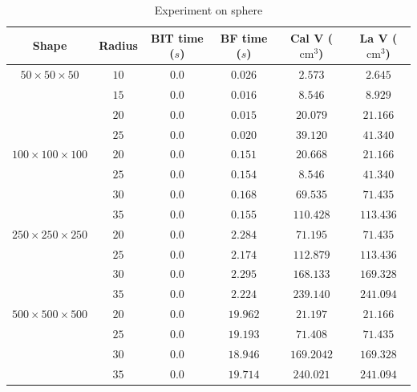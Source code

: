 \documentclass[11pt]{article}
\begin{document}
\begin{multicols}{2}
\begin{table}[]
\begin{tabular}{c|c|c|c|c|c}
    \midrule
    \textbf{Shape} & \textbf{Radius} & \textbf{BIT time ($s$)} & \textbf{BF time ($s$)} & \textbf{Cal V ($\text{cm}^3$)} & \textbf{La V ($\text{cm}^3$)} \\ 
    \midrule
    $50 \times 50 \times 50$ & $10$ & $0.0$ & $0.026$ & $2.573$ & $2.645$ \\ 
    & $15$ & $0.0$ & $0.016$ & $8.546$ & $8.929$ \\ 
    & $20$ & $0.0$ & $0.015$ & $20.079$ & $21.166$ \\ 
    & $25$ & $0.0$ & $0.020$ & $39.120$ & $41.340$ \\ 
    \midrule
    $100 \times 100 \times 100$ & $20$ & $0.0$ & $0.151$ & $20.668$ & $21.166$ \\ 
    & $25$ & $0.0$ & $0.154$ & $8.546$ & $41.340$ \\ 
    & $30$ & $0.0$ & $0.168$ & $69.535$ & $71.435$ \\ 
    & $35$ & $0.0$ & $0.155$ & $110.428$ & $113.436$ \\ 
    \midrule
    $250 \times 250 \times 250$ & $20$ & $0.0$ & $2.284$ & $71.195$ & $71.435$ \\ 
    & $25$ & $0.0$ & $2.174$ & $112.879$ & $113.436$ \\ 
    & $30$ & $0.0$ & $2.295$ & $168.133$ & $169.328$ \\ 
    & $35$ & $0.0$ & $2.224$ & $239.140$ & $241.094$ \\ 
    \midrule
    $500 \times 500 \times 500$ & $20$ & $0.0$ & $19.962$ & $21.197$ & $21.166$ \\ 
    & $25$ & $0.0$ & $19.193$ & $71.408$ & $71.435$ \\ 
    & $30$ & $0.0$ & $18.946$ & $169.2042$ & $169.328$ \\ 
    & $35$ & $0.0$ & $19.714$ & $240.021$ & $241.094$ \\ 

    \end{tabular}
    \caption{Experiment on sphere}
    \label{tab:Experiment sphere display}
\end{table}

\begin{table}[]
    \centering
    \begin{tabular}{c|c|c|c|c|c}
    

\end{tabular}
\end{table}
\end{multicols}
\end{document}
